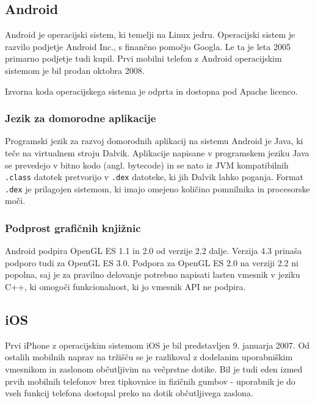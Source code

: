 \subsection{Android}

Android \cite{andriod} je operacijski sistem, ki temelji na Linux jedru. Operacijski sistem je razvilo podjetje Android Inc., s finančno pomočjo Googla. Le ta je leta 2005 primarno podjetje tudi kupil. Prvi mobilni telefon z Android operacijskim sistemom je bil prodan oktobra 2008.

Izvorna koda operacijskega sistema je odprta in dostopna pod Apache licenco.

\subsubsection{Jezik za domorodne aplikacije}

Programski jezik za razvoj domorodnih aplikacij na sistemu Android je Java, ki teče na virtualnem stroju Dalvik. Aplikacije napisane v programskem jeziku Java se prevedejo v bitno kodo (angl. bytecode) in se nato iz JVM kompatibilnih \texttt{.class} datotek pretvorijo v \texttt{.dex} datoteke, ki jih Dalvik lahko poganja. Format \texttt{.dex} je prilagojen sistemom, ki imajo omejeno količino pomnilnika in procesorske moči.

\subsubsection{Podprost grafičnih knjižnic}

Android podpira OpenGL ES 1.1 in 2.0 od verzije 2.2 dalje. Verzija 4.3 prinaša podporo tudi za OpenGL ES 3.0. Podpora za OpenGL ES 2.0 na verziji 2.2 ni popolna, saj je za pravilno delovanje potrebno napisati lasten vmesnik v jeziku C++, ki omogoči funkcionalnost, ki jo vmesnik API ne podpira.

\subsection{iOS}

Prvi iPhone z operacijskim sistemom iOS \cite{ios} je bil predstavljen 9. januarja 2007. Od ostalih mobilnih naprav na tržišču se je razlikoval z dodelanim uporabniškim vmesnikom in zaslonom občutljivim na večprstne dotike. Bil je tudi eden izmed prvih mobilnih telefonov brez tipkovnice in fizičnih gumbov - uporabnik je do vseh funkcij telefona dostopal preko na dotik občutljivega zaslona.


